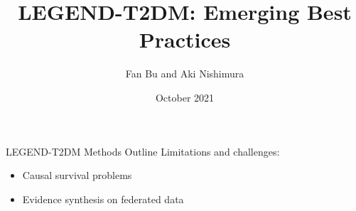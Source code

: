 \documentclass[aspectratio=169,xcolor=dvipsnames]{beamer}					%
\title{\hspace{0.2in}LEGEND-T2DM: Emerging Best Practices}	%
\author{Fan Bu and Aki Nishimura}								%
\institute{on behalf of the LEGEND initiative}					%
\date{October 2021}
\begin{document}
{
%
\begin{frame}[plain]
  \titlepage
\end{frame}
}

{
\begin{frame}{LEGEND-T2DM Methods Outline}
Limitations and challenges:
\begin{itemize}
    \item Causal survival problems
    \item Evidence synthesis on federated data
\end{itemize}
\end{frame}
}
\end{document}
